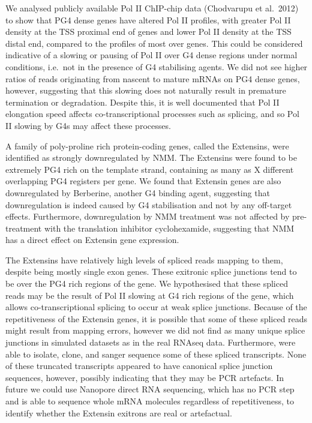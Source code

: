 \documentclass[12pt,a4paper,]{report}
\begin{document}
We analysed publicly available Pol II ChIP-chip data (Chodvarupu et
al.~2012) to show that PG4 dense genes have altered Pol II profiles,
with greater Pol II density at the TSS proximal end of genes and lower
Pol II density at the TSS distal end, compared to the profiles of most
over genes. This could be considered indicative of a slowing or pausing
of Pol II over G4 dense regions under normal conditions, i.e.~not in the
presence of G4 stabilising agents. We did not see higher ratios of reads
originating from nascent to mature mRNAs on PG4 dense genes, however,
suggesting that this slowing does not naturally result in premature
termination or degradation. Despite this, it is well documented that Pol
II elongation speed affects co-transcriptional processes such as
splicing, and so Pol II slowing by G4s may affect these processes.

A family of poly-proline rich protein-coding genes, called the
Extensins, were identified as strongly downregulated by NMM. The
Extensins were found to be extremely PG4 rich on the template strand,
containing as many as X different overlapping PG4 registers per gene. We
found that Extensin genes are also downregulated by Berberine, another
G4 binding agent, suggesting that downregulation is indeed caused by G4
stabilisation and not by any off-target effects. Furthermore,
downregulation by NMM treatment was not affected by pre-treatment with
the translation inhibitor cyclohexamide, suggesting that NMM has a
direct effect on Extensin gene expression.

The Extensins have relatively high levels of spliced reads mapping to
them, despite being mostly single exon genes. These exitronic splice
junctions tend to be over the PG4 rich regions of the gene. We
hypothesised that these spliced reads may be the result of Pol II
slowing at G4 rich regions of the gene, which allows co-transcriptional
splicing to occur at weak splice junctions. Because of the
repetitiveness of the Extensin genes, it is possible that some of these
spliced reads might result from mapping errors, however we did not find
as many unique splice junctions in simulated datasets as in the real
RNAseq data. Furthermore, were able to isolate, clone, and sanger
sequence some of these spliced transcripts. None of these truncated
transcripts appeared to have canonical splice junction sequences,
however, possibly indicating that they may be PCR artefacts. In future
we could use Nanopore direct RNA sequencing, which has no PCR step and
is able to sequence whole mRNA molecules regardless of repetitiveness,
to identify whether the Extensin exitrons are real or artefactual.
\end{document}
